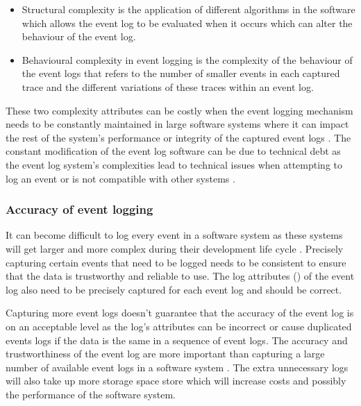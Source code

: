 \begin{itemize}
	\item Structural complexity is the application of different algorithms in the software which allows the event log to be evaluated when it occurs which can alter the behaviour of the event log.
	\item Behavioural complexity in event logging is the complexity of the behaviour of the event logs that refers to the number of smaller events in each captured trace and the different variations of these traces within an event log.
\end{itemize}

These two complexity attributes can be costly when the event logging mechanism needs to be constantly maintained in large software systems where it can impact the rest of the system's performance or integrity of the captured event logs \cite{Ogheneovo2014}. The constant modification of the event log software can be due to technical debt as the event log system's complexities lead to technical issues when attempting to log an event or is not compatible with other systems \cite{DeLeon-Sigg2020}.  

\subsubsection{Accuracy of event logging} 
It can become difficult to log every event in a software system as these systems will get larger and more complex during their development life cycle \cite{Stojanov2017}. Precisely capturing certain events that need to be logged needs to be consistent to ensure that the data is trustworthy and reliable to use. The log attributes () of the event log also need to be precisely captured for each event log and should be correct.\par Capturing more event logs doesn't guarantee that the accuracy of the event log is on an acceptable level as the log's attributes can be incorrect or cause duplicated events logs if the data is the same in a sequence of event logs. The accuracy and trustworthiness of the event log are more important than capturing a large number of available event logs in a software system \cite{Zhu2015, Jans2012}. The extra unnecessary logs will also take up more storage space store which will increase costs and possibly the performance of the software system. 

